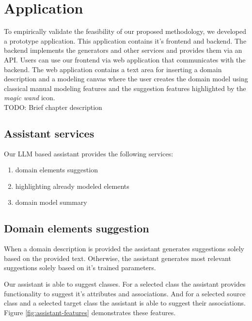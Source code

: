 \section{Application}

To empirically validate the feasibility of our proposed methodology, we developed a prototype application. This application contains it's frontend and backend. The backend  implements the generators and other services and provides them via an API. Users can use our frontend via web application that communicates with the backend. The web application contains a text area for inserting a domain description and a modeling canvas where the user creates the domain model using classical manual modeling features and the suggestion features highlighted by the \textit{magic wand} icon. \\

TODO: Brief chapter description \\

\subsection{Assistant services}

Our LLM based assistant provides the following services:
\begin{enumerate}
\item domain elements suggestion
\item highlighting already modeled elements
\item domain model summary
\end{enumerate}

\subsection{Domain elements suggestion}

When a domain description is provided the assistant generates suggestions solely based on the provided text. Otherwise, the assistant generates most relevant suggestions solely based on it's trained parameters.

Our assistant is able to suggest classes. For a selected class the assistant provides functionality to suggest it's attributes and associations. And for a selected source class and a selected target class the assistant is able to suggest their associations. Figure \ref{fig:assistant-features} demonstrates these features.

